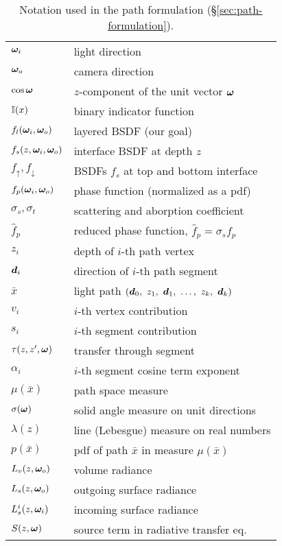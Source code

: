 \begin{table}
	\caption{Notation used in the path formulation (\S\ref{sec:path-formulation}).}
	\label{tab:notation}
	\begin{tabular}{ll}
		$\bm{\omega}_i$ & light direction \\
		$\bm{\omega}_o$ & camera direction \\
		$\cos \bm{\omega}$ & $z$-component of the unit vector $\bm{\omega}$ \\
		$\mathbb{I}(x)$ & binary indicator function \\
		\hline
		
		$f_l(\bm{\omega}_i, \bm{\omega}_o)$ & layered BSDF (our goal) \\
		$f_s(z, \bm{\omega}_i, \bm{\omega}_o)$ & interface BSDF at depth $z$ \\
		$f_\uparrow, f_\downarrow$ & BSDFs $f_s$ at top and bottom interface \\
		$f_p(\bm{\omega}_i, \bm{\omega}_o)$ & phase function (normalized as a pdf) \\
		$\sigma_s, \sigma_t$ & scattering and aborption coefficient \\
		$\hat f_p$ & reduced phase function, $\hat f_p = \sigma_s f_p$ \\
		\hline
		
		$z_i$ & depth of $i$-th path vertex \\
		$\bm{d}_i$ & direction of $i$-th path segment \\
		$\bar x$ & light path $(\bd_0,\ z_1,\ \bd_1,\ \dots,\ z_k,\ \bd_k)$ \\
		$v_i$ & $i$-th vertex contribution \\
		$s_i$ & $i$-th segment contribution \\
		$\tau(z, z', \bm{\omega})$ & transfer through segment \\
		$\alpha_i$ & $i$-th segment cosine term exponent \\
		$\mu(\bar x)$ & path space measure \\
		$\sigma(\bm{\omega})$ & solid angle measure on unit directions \\
		$\lambda(z)$ & line (Lebesgue) measure on real numbers \\
		$p(\bar x)$ & pdf of path $\bar x$ in measure $\mu(\bar x)$ \\
		\hline
		
		$L_v(z, \bm{\omega}_o)$ & volume radiance \\
		$L_s(z, \bm{\omega}_o)$ & outgoing surface radiance \\
		$L^i_s(z, \bm{\omega}_i)$ & incoming surface radiance \\
		$S(z, \bm{\omega})$ & source term in radiative transfer eq. \\
	\end{tabular}
\end{table}
